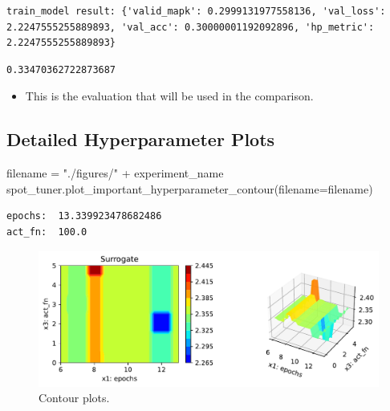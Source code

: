 \documentclass[
  letterpaper,
  DIV=11,
  numbers=noendperiod]{scrreprt}
\newenvironment{Shaded}{\begin{snugshade}}{\end{snugshade}}
\newcommand{\NormalTok}[1]{\textcolor[rgb]{0.00,0.23,0.31}{#1}}
\newcommand{\OperatorTok}[1]{\textcolor[rgb]{0.37,0.37,0.37}{#1}}
\newcommand{\StringTok}[1]{\textcolor[rgb]{0.13,0.47,0.30}{#1}}
\providecommand{\tightlist}{%
  \setlength{\itemsep}{0pt}\setlength{\parskip}{0pt}}\usepackage{longtable,booktabs,array}
\begin{document}
\begin{verbatim}
train_model result: {'valid_mapk': 0.2999131977558136, 'val_loss': 2.2247555255889893, 'val_acc': 0.30000001192092896, 'hp_metric': 2.2247555255889893}
\end{verbatim}

\begin{verbatim}
0.33470362722873687
\end{verbatim}

\begin{tcolorbox}[enhanced jigsaw, left=2mm, title=\textcolor{quarto-callout-note-color}{\faInfo}\hspace{0.5em}{Note: Evaluation for the Final Comaprison}, titlerule=0mm, toprule=.15mm, leftrule=.75mm, colbacktitle=quarto-callout-note-color!10!white, colback=white, arc=.35mm, toptitle=1mm, bottomtitle=1mm, colframe=quarto-callout-note-color-frame, bottomrule=.15mm, rightrule=.15mm, breakable, coltitle=black, opacitybacktitle=0.6, opacityback=0]

\begin{itemize}
\tightlist
\item
  This is the evaluation that will be used in the comparison.
\end{itemize}

\end{tcolorbox}

\hypertarget{detailed-hyperparameter-plots-7}{%
\subsection{Detailed Hyperparameter
Plots}\label{detailed-hyperparameter-plots-7}}

\begin{Shaded}
\begin{Highlighting}[]
\NormalTok{filename }\OperatorTok{=} \StringTok{"./figures/"} \OperatorTok{+}\NormalTok{ experiment\_name}
\NormalTok{spot\_tuner.plot\_important\_hyperparameter\_contour(filename}\OperatorTok{=}\NormalTok{filename)}
\end{Highlighting}
\end{Shaded}

\begin{verbatim}
epochs:  13.339923478682486
act_fn:  100.0
\end{verbatim}

\begin{figure}[H]

{\centering \includegraphics{31_spot_lightning_csv_files/figure-pdf/cell-20-output-2.pdf}

}

\caption{Contour plots.}

\end{figure}
\end{document}
